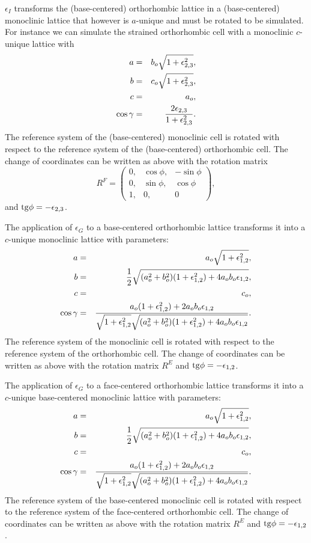 \documentclass[12pt,a4paper,twoside]{report}
\begin{document}
$\epsilon_I$ transforms the (base-centered) orthorhombic lattice 
in a (base-centered) monoclinic lattice that 
however is $a$-unique and must be rotated to be simulated.
For instance we can simulate the strained orthorhombic cell with a monoclinic
$c$-unique lattice with
\begin{eqnarray}
a&=&b_o \sqrt{1+\epsilon_{2,3}^2}, \\
b&=&c_o \sqrt{1+\epsilon_{2,3}^2}, \\
c&=&a_o, \\
\cos\gamma &=& {2 \epsilon_{2,3} \over 1 + \epsilon_{2,3}^2}. 
\end{eqnarray}
The reference system of the (base-centered) monoclinic cell is 
rotated with respect to
the reference system of the (base-centered) orthorhombic cell. 
The change of coordinates can be written as above with the rotation matrix 
\begin{equation}
R^F=\left( \begin{array}{ccc}
0, & \cos \phi, &  -\sin \phi
\\
0, & \sin \phi, & \cos \phi 
\\
1, & 0, & 0
\end{array}
\right),
\end{equation}
and ${\rm tg} \phi =-\epsilon_{2,3}$. 

The application of $\epsilon_G$ to a base-centered orthorhombic lattice
transforms it into a $c$-unique monoclinic lattice with parameters:
\begin{eqnarray}
a&=&a_o \sqrt{1+\epsilon_{1,2}^2}, \\
b&=&{1\over 2} \sqrt{(a_o^2+b_o^2)(1+\epsilon_{1,2}^2)+4a_ob_o\epsilon_{1,2}}, \\
c&=&c_o,  \\
\cos\gamma &=& {a_o (1+\epsilon_{1,2}^2)+2a_ob_o\epsilon_{1,2} \over
\sqrt{1+\epsilon_{1,2}^2} \sqrt{(a_o^2+b_o^2)
(1+\epsilon_{1,2}^2)+4a_ob_o\epsilon_{1,2}}}. 
\end{eqnarray}
The reference system of the monoclinic cell is rotated with respect to
the reference system of the orthorhombic cell. 
The change of coordinates can be written as above with the rotation matrix 
$R^E$ and ${\rm tg}\phi=-\epsilon_{1,2}$.

The application of $\epsilon_G$ to a face-centered orthorhombic lattice
transforms it into a $c$-unique base-centered monoclinic lattice with 
parameters:
\begin{eqnarray}
a&=&a_o \sqrt{1+\epsilon_{1,2}^2}, \\
b&=&{1\over 2} \sqrt{(a_o^2+b_o^2)(1+\epsilon_{1,2}^2)+4a_ob_o\epsilon_{1,2}}, \\
c&=&c_o,  \\
\cos\gamma &=& {a_o (1+\epsilon_{1,2}^2)+2a_ob_o\epsilon_{1,2} \over
\sqrt{1+\epsilon_{1,2}^2} \sqrt{(a_o^2+b_o^2)
(1+\epsilon_{1,2}^2)+4a_ob_o\epsilon_{1,2}}}. 
\end{eqnarray}
The reference system of the base-centered monoclinic cell is rotated 
with respect to the reference system of the face-centered orthorhombic cell. 
The change of coordinates can be written as above with the rotation matrix 
$R^E$ and ${\rm tg}\phi=-\epsilon_{1,2}$.
\end{document}
